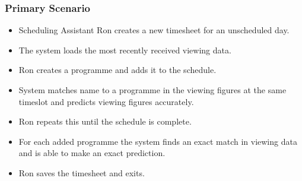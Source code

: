 \documentclass[11pt, oneside]{article}
\begin{document}
\subsubsection*{Primary Scenario}
\begin{itemize}
\renewcommand\labelitemi{--}
\item Scheduling Assistant Ron creates a new timesheet for an unscheduled day.
\item The system loads the most recently received viewing data.
\item Ron creates a programme and adds it to the schedule.
\item System matches name to a programme in the viewing figures at the same timeslot and predicts viewing figures accurately.
\item Ron repeats this until the schedule is complete.
\item For each added programme the system finds an exact match in viewing data and is able to make an exact prediction.
\item Ron saves the timesheet and exits.
\end{itemize}
\end{document}
